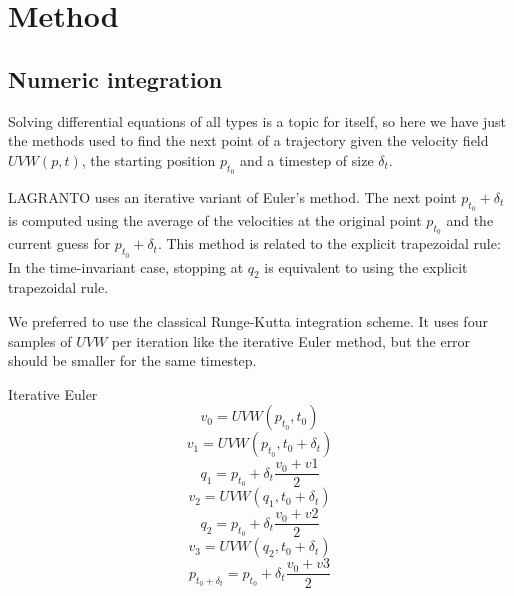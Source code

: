 \chapter{Method}

\section{Numeric integration}\label{sec:integrator}
Solving differential equations of all types is a topic for itself, so here we have just the methods used to find the next point of a trajectory given the velocity field $UVW(p,t)$, the starting position $p_{t_0}$ and a timestep of size $\delta_t$.

LAGRANTO uses an iterative variant of Euler's method. The next point $p_{t_0}+\delta_t$ is computed using the average of the velocities at the original point $p_{t_0}$ and the current guess for $p_{t_0}+\delta_t$. This method is related to the explicit trapezoidal rule: In the time-invariant case, stopping at $q_2$ is equivalent to using the explicit trapezoidal rule.

We preferred to use the classical Runge-Kutta integration scheme. It uses four samples of $UVW$ per iteration like the iterative Euler method, but the error should be smaller for the same timestep.


Iterative Euler
\begin{equation}
	v_0 = UVW(p_{t_0}, t_0)
\end{equation}
\begin{equation}
	v_1 = UVW(p_{t_0}, t_0 + \delta_t)
\end{equation}
\begin{equation}
	q_1 = p_{t_0} + \delta_t \frac{ v_0  + v1}{2}
\end{equation}
\begin{equation}
	v_2 = UVW(q_1, t_0 + \delta_t)
\end{equation}
\begin{equation}
	q_2 = p_{t_0} + \delta_t \frac{ v_0  + v2}{2}
\end{equation}
\begin{equation}
	v_3 = UVW(q_2, t_0 + \delta_t)
\end{equation}
\begin{equation}
	p_{t_0 + \delta_t} = p_{t_0} + \delta_t \frac{ v_0  + v3}{2}
\end{equation}

